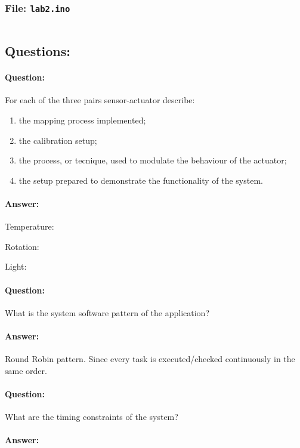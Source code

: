\documentclass[10pt]{article}
\begin{document}
\inputminted{arduino}{../sensor.hpp}

\subsubsection{File: \texttt{lab2.ino}}
\inputminted{arduino}{../lab2.ino}

\subsection{Questions:}

\paragraph{Question:}

For each of the three pairs sensor-actuator describe:
\begin{enumerate}
    \item the mapping process implemented;
    \item the calibration setup;
    \item the process, or tecnique, used to modulate the behaviour of the
        actuator;
    \item the setup prepared to demonstrate the functionality of the system.
\end{enumerate}

\paragraph{Answer:}

Temperature:


Rotation:


Light:


\paragraph{Question:}

What is the system software pattern of the application?

\paragraph{Answer:}

Round Robin pattern. Since every task is executed/checked continuously in the
same order. %

\paragraph{Question:}

What are the timing constraints of the system?

\paragraph{Answer:}
\end{document}
